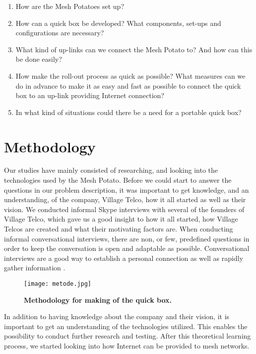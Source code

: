 \begin{enumerate}
\item How are the Mesh Potatoes set up? 
\item How can a \gls{quick} box be developed? What components, set-ups and configurations are necessary?
\item What kind of up-links can we connect the Mesh Potato to? And how can this be done easily? 
\item How make the roll-out process as quick as possible? What measures can we do in advance to make it as easy and fast as possible to connect the \gls{quick} box to an up-link providing Internet connection?
\item In what kind of situations could there be a need for a portable \gls{quick} box?
\end{enumerate}


\section{Methodology}

Our studies have mainly consisted of researching, and looking into the technologies used by the Mesh Potato. Before we could start to answer the questions in our problem description, it was important to get knowledge, and an understanding, of the company, Village Telco, how it all started as well as their vision. We conducted informal Skype interviews with several of the founders of Village Telco, which gave us a good insight to how it all started, how Village Telcos are created and what their motivating factors are. When conducting informal conversational interviews, there are non, or few, predefined questions in order to keep the conversation is open and adaptable as possible. Conversational interviews are a good way to establish a personal connection as well as rapidly gather information \cite{interview}. 

\begin{figure}[b]
  \centering
      \texttt{[image: metode.jpg]}
  \caption [Methodology for making of the \gls{quick} box]{\textbf{Methodology for making of the \gls{quick} box.}}
  \label{fig:metode}
\end{figure}


In addition to having knowledge about the company and their vision, it is important to get an understanding of the technologies utilized. This enables the possibility to conduct further research and testing. After this theoretical learning process, we started looking into how Internet can be provided to mesh networks. 

